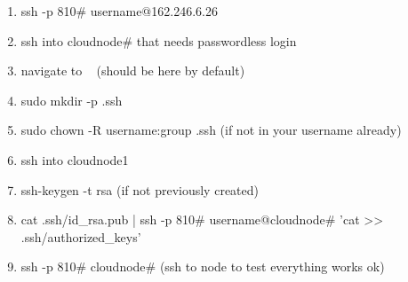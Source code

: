 \begin{enumerate}
\item ssh -p 810# username@162.246.6.26
\item ssh into cloudnode# that needs passwordless login
\item navigate to ~ (should be here by default)
\item sudo mkdir -p .ssh
\item sudo chown -R username:group .ssh (if not in your username already)
\item ssh into cloudnode1
\item ssh-keygen -t rsa (if not previously created)
\item cat .ssh/id_rsa.pub | ssh -p 810# username@cloudnode# 'cat >> .ssh/authorized_keys'
\item ssh -p 810# cloudnode# (ssh to node to test everything works ok)
\end{enumerate}
